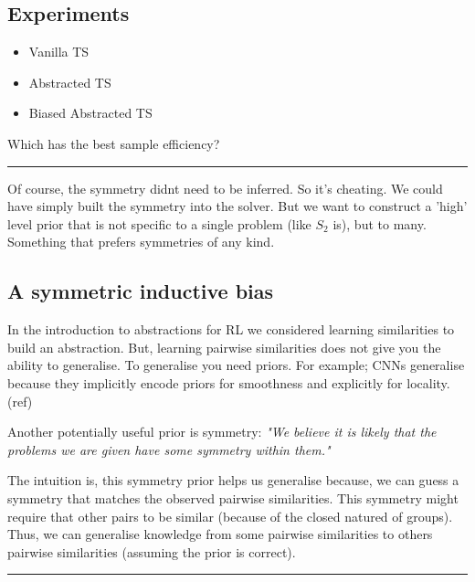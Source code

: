 \subsection{Experiments}

\begin{itemize}
	\tightlist
	\item Vanilla TS
	\item Abstracted TS
	\item Biased Abstracted TS
\end{itemize}

Which has the best sample efficiency?

\begin{center}\rule{0.5\linewidth}{\linethickness}\end{center}

Of course, the symmetry didnt need to be inferred. So it's cheating.
We could have simply built the symmetry into the solver. But we want to
construct a 'high' level prior that is not specific to a single problem (like $S_2$ is), but
to many. Something that prefers symmetries of any kind.

\subsection{A symmetric inductive bias}


In the introduction to abstractions for RL we considered learning similarities
to build an abstraction. But, learning pairwise similarities does not give
you the ability to generalise. To generalise you need priors. For example;
CNNs generalise because they implicitly encode priors for smoothness and explicitly for locality. (ref)

Another potentially useful prior is symmetry: \textit{"We believe it is likely that
the problems we are given have some symmetry within them."}

The intuition is, this symmetry prior helps us generalise because, we can guess
a symmetry that matches the observed pairwise similarities. This symmetry might
require that other pairs to be similar (because of the closed natured of groups).
Thus, we can generalise knowledge from some pairwise similarities to others
pairwise similarities (assuming the prior is correct).


\begin{center}\rule{0.5\linewidth}{\linethickness}\end{center}


